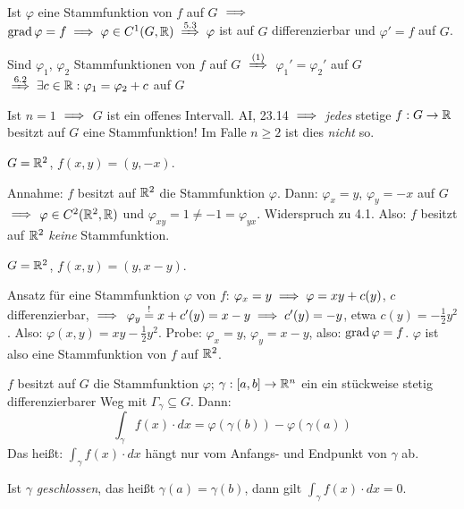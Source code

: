 \documentclass[a4paper,twoside,DIV15,BCOR12mm,chapterprefix=true,headings=twolinechapter]{scrbook}
\begin{document}
\begin{bemerkung}
\ 
\vspace{-1.5em}
\begin{liste}
\item Ist $\varphi$ eine Stammfunktion von $f$ auf $G$ $\implies$ $\grad\varphi = f \folgt \varphi \in C^1(G,\MdR) \folgtnach{5.3} \varphi$ ist auf $G$ differenzierbar und $\varphi' = f$ auf $G$.
\item Sind $\varphi_1$, $\varphi_2$ Stammfunktionen von $f$ auf $G$ $\folgtnach{(1)}$ $\varphi_1'=\varphi_2'$ auf $G$ $\folgtnach{6.2} \exists c\in\MdR: \varphi_1=\varphi_2+c$ auf $G$
\item Ist $n=1$ $\implies$ $G$ ist ein offenes Intervall. AI, 23.14 $\implies$ \emph{jedes} stetige $f:G\to\mathbb{R}$ besitzt auf $G$ eine Stammfunktion! Im Falle $n\ge 2$ ist dies \emph{nicht} so.
\end{liste}
\end{bemerkung}

\begin{beispiele}
\item $G=\mathbb{R}^2$, $f(x,y) = (y,-x)$.

Annahme: $f$ besitzt auf $\mathbb{R}^2$ die Stammfunktion $\varphi$. Dann: $\varphi_x = y$, $\varphi_y = -x$ auf $G$ $\implies$ $\varphi\in C^2(\mathbb{R}^2,\mathbb{R})$ und $\varphi_{xy} = 1 \ne -1 = \varphi_{yx}$. Widerspruch zu 4.1. Also: $f$ besitzt auf $\mathbb{R}^2$ \emph{keine} Stammfunktion.
\item $G=\mathbb{R}^2$, $f(x,y) = (y,x-y)$.

Ansatz für eine Stammfunktion $\varphi$ von $f$: $\varphi_x=y \implies \varphi=xy+c(y)$, $c$ differenzierbar, $\implies$ $\varphi_y\stackrel{!}{=}x+c'(y) = x-y \implies c'(y) = -y$, etwa $c(y)=-\frac{1}{2}y^2$. Also: $\varphi(x,y) = xy - \frac{1}{2}y^2$. Probe: $\varphi_x=y$, $\varphi_y=x-y$, also: $\mathop{\rm grad}\nolimits\varphi=f$. $\varphi$ ist also eine Stammfunktion von $f$ auf $\mathbb{R}^2$.
\end{beispiele}
\vspace{2em} %
\begin{satz}
$f$ besitzt auf $G$ die Stammfunktion $\varphi$; $\gamma:[a,b]\to\mathbb{R}^n$ ein ein stückweise stetig differenzierbarer Weg mit $\Gamma_\gamma\subseteq G$. Dann:
$$ \int_\gamma f(x)\cdot dx = \varphi\left(\gamma(b)\right) - \varphi\left(\gamma(a)\right) $$
Das heißt: $\int_\gamma f(x)\cdot dx$ hängt nur vom Anfangs- und Endpunkt von $\gamma$ ab.

Ist $\gamma$ \emph{geschlossen}, das heißt $\gamma(a) = \gamma(b)$, dann gilt $\int_\gamma f(x)\cdot dx = 0$.
\end{satz}
\end{document}
